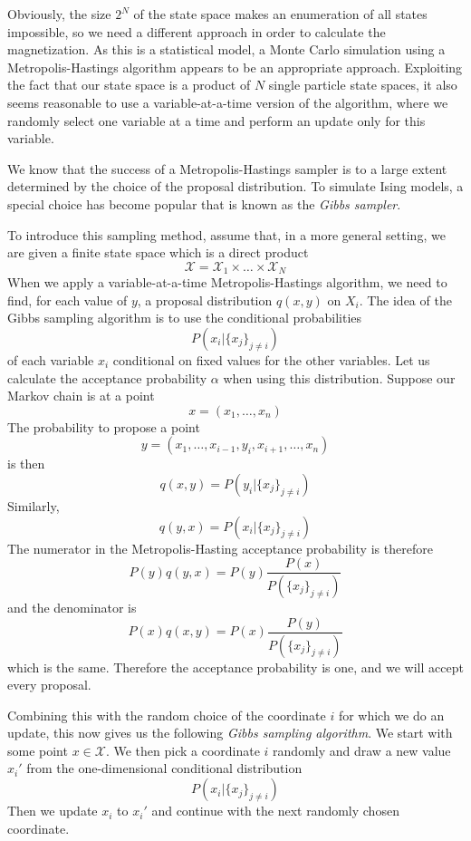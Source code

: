 \documentclass[a4paper, draft]{article}
\theoremstyle{own}
\theoremstyle{remark}
\begin{document}
Obviously, the size $2^N$ of the state space makes an enumeration of all states impossible, so we need a different approach in order to calculate the magnetization. As this is a statistical model, a Monte Carlo simulation using a Metropolis-Hastings algorithm appears to be an appropriate approach. Exploiting the fact that our state space is a product of $N$ single particle state spaces, it also seems reasonable to use a variable-at-a-time version of the algorithm, where we randomly select one variable at a time and perform an update only for this variable.

We know that the success of a Metropolis-Hastings sampler is to a large extent determined by the choice of the proposal distribution. To simulate Ising models, a special choice has become popular that is known as the {\em Gibbs sampler}. 

To introduce this sampling method, assume that, in a more general setting, we are given a finite state space which is a direct product
$$
{\mathcal X} = {\mathcal X}_1 \times \dots \times {\mathcal X}_N
$$
When we apply a variable-at-a-time Metropolis-Hastings algorithm, we need to find, for each value of $y$, a proposal distribution $q(x,y)$ on $X_i$. The idea of the Gibbs sampling algorithm is to use the conditional probabilities
$$
P(x_i | \{ x_j \}_{j \neq i})
$$
of each variable $x_i$ conditional on fixed values for the other variables. Let us calculate the acceptance probability $\alpha$ when using this distribution. Suppose our Markov chain is at a point
$$
x = (x_1, \dots, x_n)
$$
The probability to propose a point
$$
y = (x_1, \dots, x_{i-1}, y_i, x_{i+1}, \dots, x_n)
$$
is then
$$
q(x,y) = P(y_i | \{ x_j \}_{j \neq i})
$$
Similarly,
$$
q(y,x) = P(x_i | \{ x_j \}_{j \neq i})
$$
The numerator in the Metropolis-Hasting acceptance probability is therefore
$$
P(y) q(y,x) = P(y) \frac{P(x)}{P(\{ x_j\}_{j \neq i})}
$$
and the denominator is
$$
P(x) q(x,y) = P(x) \frac{P(y)}{P(\{ x_j\}_{j \neq i})}
$$
which is the same. Therefore the acceptance probability is one, and we will accept every proposal. 

Combining this with the random choice of the coordinate $i$ for which we do an update, this now gives us the following {\em Gibbs sampling algorithm}. We start with some point $x \in {\mathcal X}$. We then pick a coordinate $i$ randomly and draw a new value $x_i'$ from the one-dimensional conditional distribution
$$
P(x_i | \{ x_j \}_{j \neq i})
$$
Then we update $x_i$ to $x_i'$ and continue with the next randomly chosen coordinate. 
\end{document}
